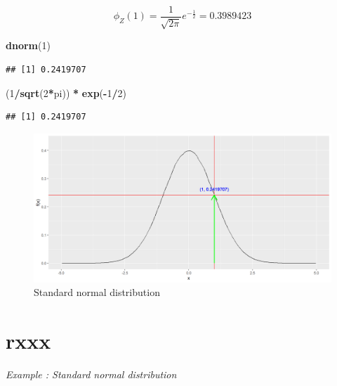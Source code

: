 \documentclass[
]{book}
\newenvironment{Shaded}{\begin{snugshade}}{\end{snugshade}}
\newcommand{\DecValTok}[1]{\textcolor[rgb]{0.00,0.00,0.81}{#1}}
\newcommand{\FunctionTok}[1]{\textcolor[rgb]{0.13,0.29,0.53}{\textbf{#1}}}
\newcommand{\NormalTok}[1]{#1}
\newcommand{\SpecialCharTok}[1]{\textcolor[rgb]{0.81,0.36,0.00}{\textbf{#1}}}
\begin{document}
\[\phi_Z(1) = \frac{1}{\sqrt{2 \pi}}e^{-\frac{1}{2}} =  0.3989423\]

\begin{Shaded}
\begin{Highlighting}[]
\FunctionTok{dnorm}\NormalTok{(}\DecValTok{1}\NormalTok{)}
\end{Highlighting}
\end{Shaded}

\begin{verbatim}
## [1] 0.2419707
\end{verbatim}

\begin{Shaded}
\begin{Highlighting}[]
\NormalTok{(}\DecValTok{1}\SpecialCharTok{/}\FunctionTok{sqrt}\NormalTok{(}\DecValTok{2}\SpecialCharTok{*}\NormalTok{pi)) }\SpecialCharTok{*} \FunctionTok{exp}\NormalTok{(}\SpecialCharTok{{-}}\DecValTok{1}\SpecialCharTok{/}\DecValTok{2}\NormalTok{)}
\end{Highlighting}
\end{Shaded}

\begin{verbatim}
## [1] 0.2419707
\end{verbatim}

\begin{figure}

{\centering \includegraphics{figure/norm5-1} 

}

\caption{Standard normal distribution}\label{fig:norm5}
\end{figure}

\hypertarget{rxxx}{%
\section{rxxx}\label{rxxx}}

\emph{Example : Standard normal distribution}
\end{document}
